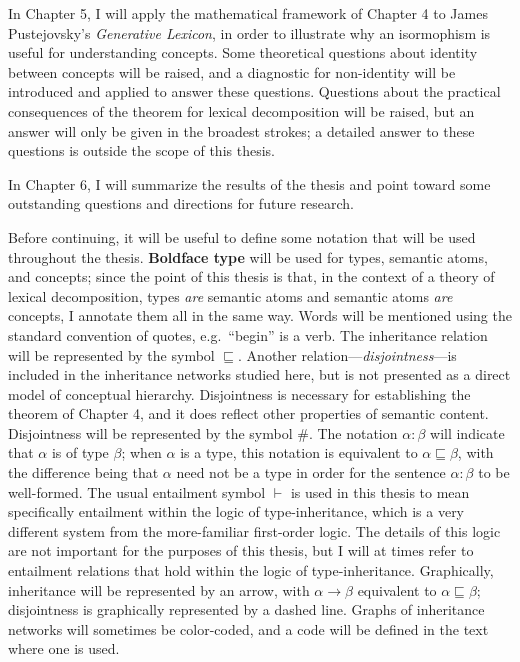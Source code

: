 In Chapter 5, I will apply the mathematical framework of Chapter 4 to James Pustejovsky's \emph{Generative Lexicon}, in order to illustrate why an isormophism is useful for understanding concepts. Some theoretical questions about identity between concepts will be raised, and a diagnostic for non-identity will be introduced and applied to answer these questions. Questions about the practical consequences of the theorem for lexical decomposition will be raised, but an answer will only be given in the broadest strokes; a detailed answer to these questions is outside the scope of this thesis.

In Chapter 6, I will summarize the results of the thesis and point toward some outstanding questions and directions for future research.

Before continuing, it will be useful to define some notation that will be used throughout the thesis. {\bf Boldface type} will be used for types, semantic atoms, and concepts; since the point of this thesis is that, in the context of a theory of lexical decomposition, types \emph{are} semantic atoms and semantic atoms \emph{are} concepts, I annotate them all in the same way. Words will be mentioned using the standard convention of quotes, e.g.\ ``begin'' is a verb. The inheritance relation will be represented by the symbol $\sqsubseteq$. Another relation---\emph{disjointness}---is included in the inheritance networks studied here, but is not presented as a direct model of conceptual hierarchy. Disjointness is necessary for establishing the theorem of Chapter 4, and it does reflect other properties of semantic content. Disjointness will be represented by the symbol $\#$. The notation $\alpha :\beta$ will indicate that $\alpha$ is of type $\beta$; when $\alpha$ is a type, this notation is equivalent to $\alpha\sqsubseteq\beta$, with the difference being that $\alpha$ need not be a type in order for the sentence $\alpha:\beta$ to be well-formed. The usual entailment symbol $\vdash$ is used in this thesis to mean specifically entailment within the logic of type-inheritance, which is a very different system from the more-familiar first-order logic. The details of this logic are not important for the purposes of this thesis, but I will at times refer to entailment relations that hold within the logic of type-inheritance. Graphically, inheritance will be represented by an arrow, with $\alpha\rightarrow\beta$ equivalent to $\alpha\sqsubseteq\beta$; disjointness is graphically represented by a dashed line. Graphs of inheritance networks will sometimes be color-coded, and a code will be defined in the text where one is used.

\clearpage
